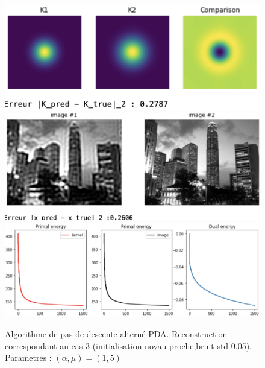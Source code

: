 \documentclass[a4paper]{article}
\begin{document}
\begin{figure}[h]
\includegraphics[scale=0.8]{figures/algov-cas3-kernel}
\includegraphics[scale=0.6]{figures/algov-cas3-image}
\includegraphics[scale=0.6]{figures/algov-cas3-energy}
\caption{Algorithme de pas de descente alterné PDA. Reconstruction correspondant au cas 3  (initialisation noyau proche,bruit std 0.05). Parametres : $(\alpha,\mu) =(1,5)$}
\end{figure}

\end{document}
